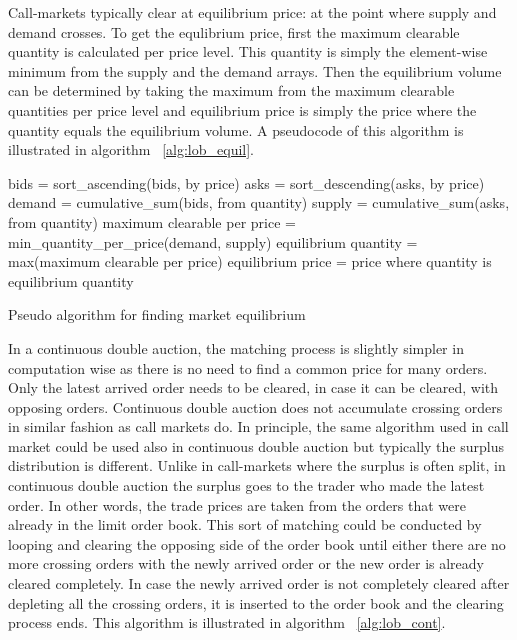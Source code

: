Call-markets typically clear at equilibrium price: at the point where
supply and demand crosses. 
To get the equlibrium price, first the maximum clearable quantity
is calculated per price level. This quantity is simply the element-wise
minimum from the supply and the demand arrays. Then the equilibrium volume
can be determined by taking the maximum from the maximum clearable quantities
per price level and equilibrium price is simply the price where the quantity
equals the equilibrium volume. A pseudocode of this algorithm is illustrated in 
algorithm ~\ref{alg:lob_equil}.

\begin{algorithm}[H]
    \SetAlgoLined
    \DontPrintSemicolon
    
    bids = sort\_ascending(bids, by price)\;
    asks = sort\_descending(asks, by price)\;
    \;
    demand = cumulative\_sum(bids, from quantity)\;
    supply = cumulative\_sum(asks, from quantity)\;
    \;
    maximum clearable per price = min\_quantity\_per\_price(demand, supply)\;
    \;
    equilibrium quantity = max(maximum clearable per price)\;
    equilibrium price = price where quantity is equilibrium quantity\;
    \caption{Pseudo algorithm for finding market equilibrium}
    \label{alg:lob_equil}
\end{algorithm}


In a continuous double auction, the matching process is slightly simpler in computation
wise as there is no need to find a common price for many orders. Only the latest arrived
order needs to be cleared, in case it can be cleared, with opposing orders. Continuous
double auction does not accumulate crossing orders in similar fashion as call markets do. 
In principle, the same algorithm used in call market could be used also in continuous double auction 
but typically the surplus distribution is different. Unlike in call-markets where the surplus is often
split, in continuous double auction the surplus goes to the trader who made the latest order.
In other words, the trade prices are taken from the orders that were already in the limit order book.
This sort of matching could be conducted by looping and clearing the opposing side of the order book until either
there are no more crossing orders with the newly arrived order or the new order is already cleared
completely. In case the newly arrived order is not completely cleared after depleting all the crossing
orders, it is inserted to the order book and the clearing process ends. This algorithm is illustrated in
algorithm ~\ref{alg:lob_cont}. 


